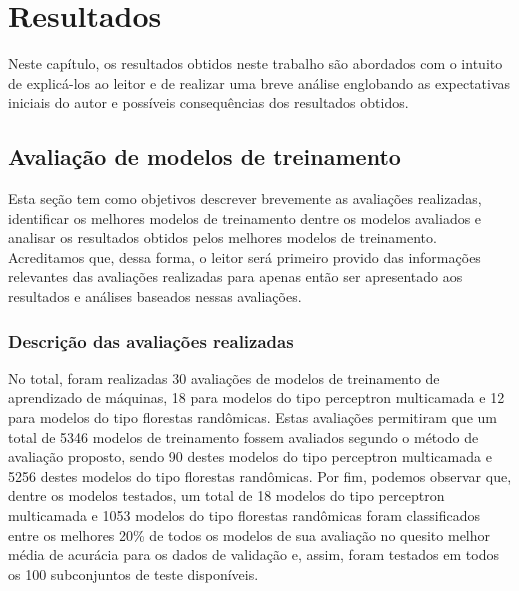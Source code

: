 \chapter{Resultados} \label{chap:resultados}

Neste capítulo, os resultados obtidos neste trabalho são abordados com o intuito de explicá-los ao leitor e de realizar uma breve análise englobando as expectativas iniciais do autor e possíveis consequências dos resultados obtidos.

\section{Avaliação de modelos de treinamento}

Esta seção tem como objetivos descrever brevemente as avaliações realizadas, identificar os melhores modelos de treinamento dentre os modelos avaliados e analisar os resultados obtidos pelos melhores modelos de treinamento. Acreditamos que, dessa forma, o leitor será primeiro provido das informações relevantes das avaliações realizadas para apenas então ser apresentado aos resultados e análises baseados nessas avaliações.

\subsection{Descrição das avaliações realizadas}

No total, foram realizadas 30 avaliações de modelos de treinamento de aprendizado de máquinas, 18 para modelos do tipo perceptron multicamada e 12 para modelos do tipo florestas randômicas. Estas avaliações permitiram que um total de 5346 modelos de treinamento fossem avaliados segundo o método de avaliação proposto, sendo 90 destes modelos do tipo perceptron multicamada e 5256 destes modelos do tipo florestas randômicas. Por fim, podemos observar que, dentre os modelos testados, um total de 18 modelos do tipo perceptron multicamada e 1053 modelos do tipo florestas randômicas foram classificados entre os melhores 20\% de todos os modelos de sua avaliação no quesito melhor média de acurácia para os dados de validação e, assim, foram testados em todos os 100 subconjuntos de teste disponíveis.

